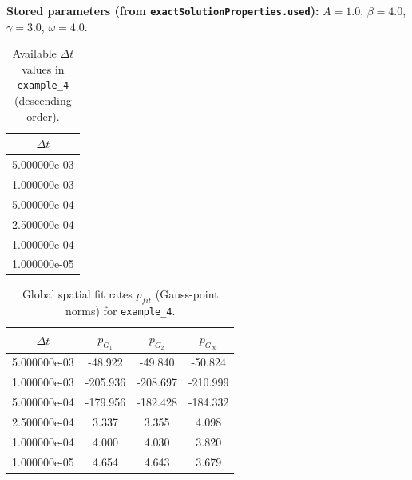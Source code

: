 \documentclass[11pt,a4paper]{article}
\begin{document}
\textbf{Stored parameters (from \texttt{exactSolutionProperties.used}):} $A=1.0$, $\beta=4.0$, $\gamma=3.0$, $\omega=4.0$.
\begin{table}[htbp]
\centering
\small
\caption{Available $\Delta t$ values in \texttt{example\_4} (descending order).}
\begin{tabular}{c}
\toprule
$\Delta t$ \\
\midrule
5.000000e-03 \\
1.000000e-03 \\
5.000000e-04 \\
2.500000e-04 \\
1.000000e-04 \\
1.000000e-05 \\
\bottomrule
\end{tabular}
\end{table}
\begin{table}[htbp]
\centering
\scriptsize
\caption{Global spatial fit rates $p_{fit}$ (cell-centered norms) for \texttt{example\_4}.}
\end{table}
\begin{table}[htbp]
\centering
\scriptsize
\caption{Global spatial fit rates $p_{fit}$ (Gauss-point norms) for \texttt{example\_4}.}
\begin{tabular}{cccc}
\toprule
$\Delta t$ & $p_{G_1}$ & $p_{G_2}$ & $p_{G_\infty}$ \\
\midrule
5.000000e-03 & -48.922 & -49.840 & -50.824 \\
1.000000e-03 & -205.936 & -208.697 & -210.999 \\
5.000000e-04 & -179.956 & -182.428 & -184.332 \\
2.500000e-04 & 3.337 & 3.355 & 4.098 \\
1.000000e-04 & 4.000 & 4.030 & 3.820 \\
1.000000e-05 & 4.654 & 4.643 & 3.679 \\
\bottomrule
\end{tabular}
\end{table}
\end{document}
